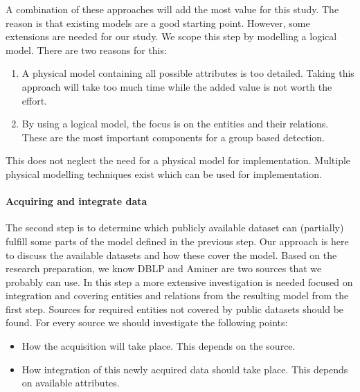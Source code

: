 \documentclass{ou-report}
\newcommand{\dblp}{DBLP}
\begin{document}
A combination of these approaches will add the most value for this study. The 
reason is that existing models are a good starting point. However, some 
extensions are needed for our study. We scope this step by modelling a logical 
model. There are two reasons for this:
\begin{enumerate}
    \item A physical model containing all possible attributes is too 
        detailed. Taking this approach will take too much time while the added
        value is not worth the effort.
    \item By using a logical model, the focus is on the entities and their
        relations. These are the most important components for a group based
        detection.
\end{enumerate}
This does not neglect the need for a physical model for implementation. 
Multiple physical modelling techniques exist which can be used for 
implementation.


\paragraph{Acquiring and integrate data}
The second step is to determine which publicly available dataset can (partially)
fulfill some parts of the model defined in the previous step. Our approach is
here to discuss the available datasets and how these cover the model.
Based on the research preparation, we know \dblp{} and Aminer are two sources
that we probably can use. In this step a more extensive investigation is 
needed focused on integration and covering entities and relations from the 
resulting model from the first step.
Sources for required entities not covered by public datasets should be found. 
For every source we should investigate the following points:

\begin{itemize}
    \item How the acquisition will take place. This depends on the source.
    \item How integration of this newly acquired data should take place. This 
        depends on available attributes.
\end{itemize}
\end{document}

